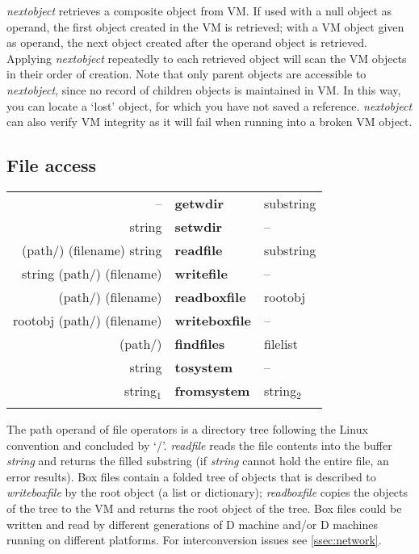 \emph{nextobject} retrieves a composite object from VM. If used with a null object as operand, the first object created in the VM is retrieved; with a VM object given as operand, the next object created after the operand object is retrieved. Applying \emph{nextobject} repeatedly to each retrieved object will scan the VM objects in their order of creation. Note that only parent objects are accessible to \emph{nextobject}, since no record of children objects is maintained in VM. In this way, you can locate a `lost' object, for which you have not saved a reference. \emph{nextobject} can also verify VM integrity as it will fail when running into a broken VM object.



\subsection{File access}

\begin{tabular}{>{\sffamily}r>{\sffamily\bfseries}l>{\sffamily}l}
-- & getwdir & substring\\
string & setwdir & --\\
(path/) (filename) string & readfile & substring\\
string (path/) (filename) & writefile & --\\
(path/) (filename) & readboxfile & rootobj\\
rootobj (path/) (filename) & writeboxfile & --\\
(path/) & findfiles & filelist\\
string & tosystem & --\\
string$_1$ & fromsystem & string$_2$\\\\
\end{tabular}



The path operand of file operators is a directory tree following the Linux convention and concluded by `/'. \emph{readfile} reads the file contents into the buffer \emph{string} and returns the filled substring (if \emph{string} cannot hold the entire file, an error results). Box files contain a folded tree of objects that is described to \emph{writeboxfile} by the root object (a list or dictionary); \emph{readboxfile} copies the objects of the tree to the VM and returns the root object of the tree. Box files could be written and read by different generations of D machine and/or D machines running on different platforms. For interconversion issues see \ref{ssec:network}.

